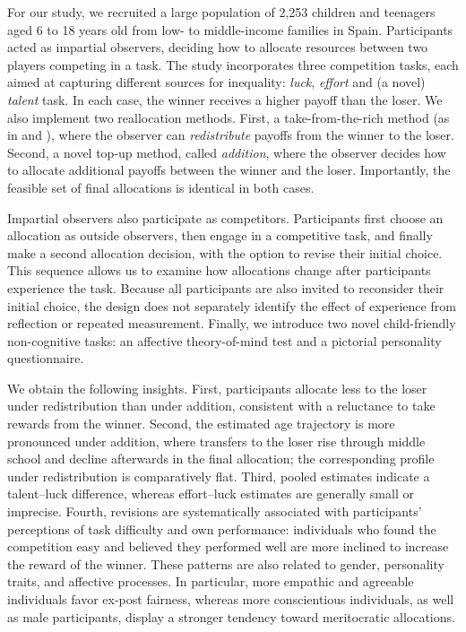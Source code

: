 \documentclass[11pt]{article}
\begin{document}
For our study, we recruited a large population of 2,253 children and teenagers aged 6 to 18 years old from low- to middle-income families in Spain. Participants acted as impartial observers, deciding how to allocate resources between two players competing in a task. The study incorporates three competition tasks, each aimed at capturing different sources for inequality: \emph{luck}, \emph{effort} and (a novel) \emph{talent} task. In each case, the winner receives a higher payoff than the loser. We also implement two reallocation methods. First, a take-from-the-rich method (as in \citet{cappelen2019meritocratic} and \citet{almaas2020cutthroat}), where the observer can \emph{redistribute} payoffs from the winner to the loser. Second, a novel top-up method, called \emph{addition}, where the observer decides how to allocate additional payoffs between the winner and the loser. Importantly, the feasible set of final allocations is identical in both cases. 


Impartial observers also participate as competitors. Participants first choose an allocation as outside observers, then engage in a competitive task, and finally make a second allocation decision, with the option to revise their initial choice. This sequence allows us to examine how allocations change after participants experience the task. Because all participants are also invited to reconsider their initial choice, the design does not separately identify the effect of experience from reflection or repeated measurement. Finally, we introduce two novel child-friendly non-cognitive tasks: an affective theory-of-mind test and a pictorial personality questionnaire.

We obtain the following insights. First, participants allocate less to the loser under redistribution than under addition, consistent with a reluctance to take rewards from the winner. Second, the estimated age trajectory is more pronounced under addition, where transfers to the loser rise through middle school and decline afterwards in the final allocation; the corresponding profile under redistribution is comparatively flat. Third, pooled estimates indicate a talent--luck difference, whereas effort--luck estimates are generally small or imprecise. Fourth, revisions are systematically associated with participants' perceptions of task difficulty and own performance: individuals who found the competition easy and believed they performed well are more inclined to increase the reward of the winner. These patterns are also related to gender, personality traits, and affective processes. In particular, more empathic and agreeable individuals favor ex-post fairness, whereas more conscientious individuals, as well as male participants, display a stronger tendency toward meritocratic allocations.
\end{document}
